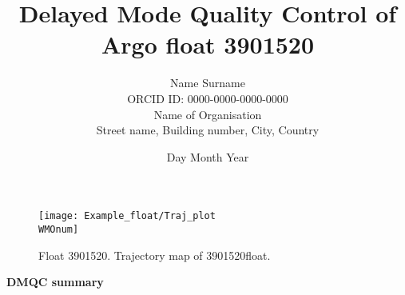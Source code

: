 \documentclass{article}
\newcommand{\WMOnum}{3901520} %
\begin{document}
\title{Delayed Mode Quality Control of Argo float \WMOnum\hspace{0.5mm}}
\author{Name Surname\\   %
ORCID ID: 0000-0000-0000-0000\vspace{1cm}\\
Name of Organisation\\
Street name, Building number, City, Country} %

\date{Day Month Year} %
\maketitle

\begin{figure}[H]
    \centering    
    \texttt{[image: Example\_float/Traj\_plot\\WMOnum]}
    \caption{Float \WMOnum. Trajectory map of \WMOnum float.}
    \label{Traj_plot}
\end{figure}

\begin{center}
	\bf{DMQC summary}
\end{center}
\end{document}
